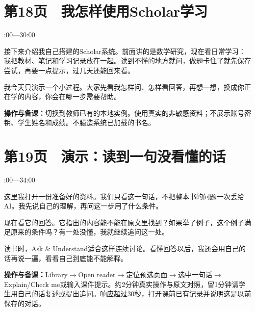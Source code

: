 \documentclass[UTF8,a4paper,11pt,fontset=fandol]{ctexart}
\newcommand{\tip}[1]{\par{\small\color{black!65}\noindent\textbf{操作与备课：}#1\par}}
\begin{document}
\par\noindent\begin{minipage}{\linewidth}

\section*{第18页　我怎样使用Scholar学习}

{\small{}:00—30:00\par}

接下来介绍我自己搭建的Scholar系统。前面讲的是数学研究，现在看日常学习：我把教材、笔记和学习记录放在一起。读到不懂的地方就问，做题卡住了就先保存尝试，再要一点提示，过几天还能回来看。

我今天只演示一个小过程。大家先看我怎样问、怎样看回答，再想一想，换成你正在学的内容，你会在哪一步需要帮助。

\tip{切换到教师已有的本地实例。使用真实的非敏感资料；不展示账号密钥、学生姓名和成绩。不臆造系统已加载的书名。}

\end{minipage}\par\vspace{2mm}

\par\noindent\begin{minipage}{\linewidth}

\section*{第19页　演示：读到一句没看懂的话}

{\small{}:00—34:00\par}

这里我打开一份准备好的资料。我们只看这一句话，不把整本书的问题一次丢给AI。我先说自己的理解，再问这一步用了什么条件。

现在看它的回答。它指出的内容能不能在原文里找到？如果举了例子，这个例子满足原来的条件吗？有一处没懂，我就继续追问这一处。

读书时，Ask \& Understand适合这样连续讨论。看懂回答以后，我还会用自己的话再说一遍，看看自己到底能不能解释。

\tip{Library$\to$Open reader$\to$定位预选页面$\to$选中一句话$\to$Explain/Check me或输入课件提示。约2分钟真实操作与原文对照，留1分钟请学生用自己的话复述或提出追问。响应超过30秒，打开课前已有记录并说明这是以前保存的对话。}

\end{minipage}\par\vspace{2mm}
\end{document}
